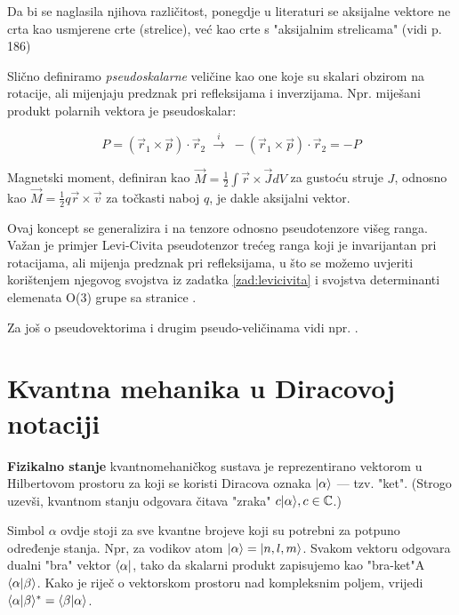 Da bi se naglasila njihova različitost,
ponegdje u literaturi se aksijalne vektore ne crta kao usmjerene crte
(strelice), već kao crte s "aksijalnim strelicama" (vidi 
\cite{Bronstejn:2004} p. 186)

\centerline{}

Slično definiramo \emph{pseudoskalarne} veličine kao one koje su skalari
obzirom na rotacije, ali mijenjaju predznak pri refleksijama i inverzijama.
Npr. miješani produkt polarnih vektora je pseudoskalar:

\[
P = (\vec{r}_1 \times \vec{p}) \cdot \vec{r}_2  \; \stackrel{i}{\longrightarrow} \;
  - (\vec{r}_1 \times \vec{p}) \cdot \vec{r}_2 = - P
\]

Magnetski moment, definiran kao $\vec{M} = \frac{1}{2} \int \vec{r}
\times \vec{J} dV$ za gustoću struje $J$, odnosno kao
$\vec{M} = \frac{1}{2} q \vec{r} \times \vec{v}$ za točkasti
naboj $q$, je dakle aksijalni vektor.

Ovaj koncept se generalizira i na tenzore odnosno pseudotenzore višeg ranga.
Važan je primjer Levi-Civita pseudotenzor 
trećeg ranga koji je invarijantan
pri rotacijama, ali mijenja predznak pri refleksijama, u što se možemo uvjeriti
korištenjem njegovog svojstva iz zadatka \ref{zad:levicivita} i svojstva
determinanti elemenata O(3) grupe sa stranice \pageref{pag:detO3}.

Za još o pseudovektorima i drugim pseudo-veličinama vidi
npr. \cite{Arfken:1995}.


\chapter{Kvantna mehanika u Diracovoj notaciji}
\label{sec:qm}

\textbf{Fizikalno stanje} kvantnomehaničkog sustava
je reprezentirano vektorom u Hilbertovom prostoru za
koji se koristi Diracova oznaka
 $| \alpha \rangle$ --- tzv. "ket". 
(Strogo uzevši, kvantnom stanju odgovara
čitava "zraka" $c| \alpha \rangle, c\in\mathbb{C}$.)

Simbol $\alpha$ ovdje stoji za sve kvantne brojeve koji su potrebni za potpuno
određenje stanja. Npr, za vodikov atom $| \alpha \rangle=| n,l,m \rangle$.
Svakom vektoru odgovara dualni "bra" vektor $\langle \alpha |$, tako
da skalarni produkt zapisujemo kao "bra-ket"A
$\langle \alpha |\beta \rangle$. Kako je riječ o vektorskom prostoru
nad kompleksnim poljem, vrijedi
$\langle \alpha |\beta \rangle^{*} = \langle \beta |\alpha \rangle$.

